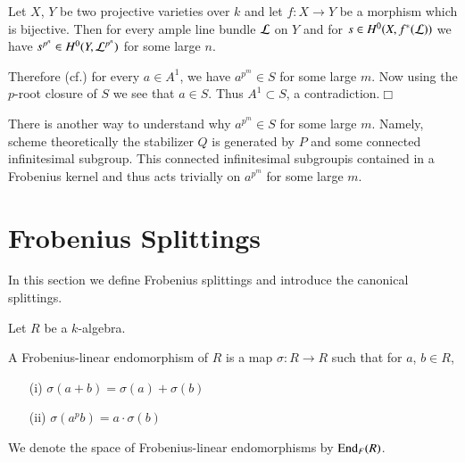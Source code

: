 \begin{sublemma}\label{chap4-lem4.2.5}
Let $X$, $Y$ be two projective varieties over $k$ and let $f:X\to Y$
be a morphism which is bijective. Then for every ample line bundle
$\mathcal{L}$ on $Y$ and for $s\in H^{0}(X,f^{*}(\mathcal{L}))$ we have $s^{p^{n}}\in
H^{0}(Y,\mathcal{L}^{p^{n}})$ for some large $n$.
\end{sublemma}

Therefore (cf.\@ \cite[II 7]{key7}) for every $a\in A^{1}$, we have
$a^{p^{m}}\in S$ for some large $m$. Now using the $p$-root closure of
$S$ we see that $a\in S$. Thus $A^{1}\subset S$, a
contradiction.\hfill$\Box$

\begin{remark}\label{chap4-rem4.2.6}
There is another way to understand why $a^{p^{m}}\in S$ for some large
$m$. Namely, scheme theoretically the stabilizer $Q$ is generated by
$P$ and some connected infinitesimal subgroup. This connected
infinitesimal subgroup\pageoriginale is\label{page39} contained in a Frobenius
kernel \cite{key11} and thus acts trivially on $a^{p^{m}}$ for some
large $m$.
\end{remark}

\section{Frobenius Splittings}\label{chap4-sec4.3}

In this section we define Frobenius splittings and introduce the
canonical splittings.

Let $R$ be a $k$-algebra.

\begin{definition}\label{chap4-defi4.3.1}
A Frobenius-linear endomorphism of $R$ is a map $\sigma:R\to R$ such
that for $a$, $b\in R$,
\begin{itemize}
\item[\rm(i)] $\sigma(a+b)=\sigma(a)+\sigma(b)$

\item[\rm(ii)] $\sigma(a^{p}b)=a\cdot\sigma(b)$
\end{itemize}

We denote the space of Frobenius-linear 
endomorphisms by $\End_{F}\break (R)$.
\end{definition}

